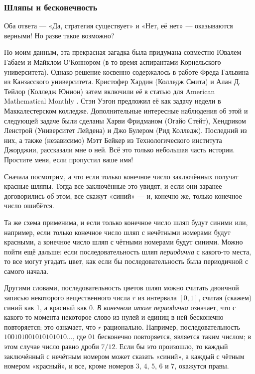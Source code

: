 \subsubsection*{Шляпы и бесконечность}

Оба ответа --- «Да, стратегия существует» и «Нет, её нет» --- оказываются верными!
Но разве такое возможно?

По моим данным, эта прекрасная загадка была придумана совместно Ювалем Габаем и Майклом О'Коннором (в то время аспирантами Корнельского университета).
Однако решение косвенно содержалось в работе Фреда Гальвина из Канзасского университета.
Кристофер Хардин (Колледж Смита) и Алан Д. Тейлор (Колледж Юнион) затем включили её в статью для American Mathematical Monthly \cite{36}.
Стэн Уэгон предложил её как задачу недели в Маккалестерском колледже.
Дополнительные интересные наблюдения об этой и следующей задаче были сделаны Харви Фридманом (Огайо Стейт), Хендриком Ленстрой (Университет Лейдена) и Джо Булером (Рид Колледж).
Последний из них, а также (независимо) Мэтт Бейкер из Технологического института Джорджии, рассказали мне о ней.
Всё это только небольшая часть истории.
Простите меня, если пропустил ваше имя!

Сначала посмотрим, а что если только конечное число заключённых получат красные шляпы.
Тогда все заключённые это увидят, и если они заранее договорились об этом, все скажут «синий» --- и, конечно же, только конечное число ошибётся.

Та же схема применима, и если только конечное число шляп будут синими или, например, если только конечное число шляп с нечётными номерами будут красными, а конечное число шляп с чётными номерами будут синими.
Можно пойти ещё дальше: если последовательность шляп \emph{периодична} с какого-то места, то все могут угадать цвет, как если бы последовательность была периодичной с самого начала.

Другими словами, последовательность цветов шляп можно считать двоичной записью некоторого вещественного числа $r$ из интервала $[0,1]$, считая (скажем) синий как 1, а красный как 0.
\emph{В конечном итоге периодична} означает, что с какого-то момента некоторое слово из нулей и единиц в ней бесконечно повторяется;
это означает, что $r$ рационально.
Например, последовательность $100101001010101010\dots$, где $01$ бесконечно повторяется, является таким числом; в этом случае число равно дроби $7/12$.
Если бы это произошло, то каждый заключённый с нечётным номером может сказать «синий», а каждый с чётным номером «красный», и все, кроме номеров $3$, $4$, $5$, $6$ и $7$, окажутся правы.

